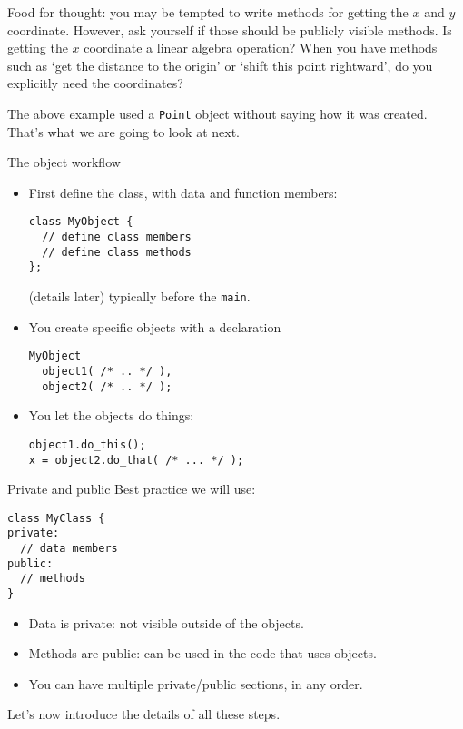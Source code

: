 Food for thought: you may be tempted  to  write methods for getting the $x$ and $y$
coordinate. However, ask yourself if those should be publicly visible methods.
Is getting the $x$ coordinate a linear algebra operation? When you have methods
such as `get the distance to the origin' or `shift this point rightward',
do you explicitly need the coordinates?

The above example used a \lstinline{Point} object without saying
how it was created.
That's what we are going to look at next.

\begin{block}{The object workflow}
  \label{sl:object-flow}
  \begin{itemize}
  \item First define the class, with data and function members:
\begin{lstlisting}
class MyObject {
  // define class members
  // define class methods
};
\end{lstlisting}
(details later)
typically before the \lstinline{main}.
  \item You create specific objects with a declaration
\begin{lstlisting}
MyObject
  object1( /* .. */ ),
  object2( /* .. */ );    
\end{lstlisting}
  \item You let the objects do things:
\begin{lstlisting}
object1.do_this();
x = object2.do_that( /* ... */ );
\end{lstlisting}
  \end{itemize}
\end{block}

\begin{block}{Private and public}
  \label{sl:public-private-basic}
  Best practice we will use:
\begin{lstlisting}
class MyClass {
private:
  // data members
public:
  // methods
}
\end{lstlisting}
\begin{itemize}
\item Data is private: not visible outside of the objects.
\item Methods are public: can be used in the code that uses objects.
\item You can have multiple private/public sections, in any order.
\end{itemize}
\end{block}

Let's now introduce the details of all these steps.

